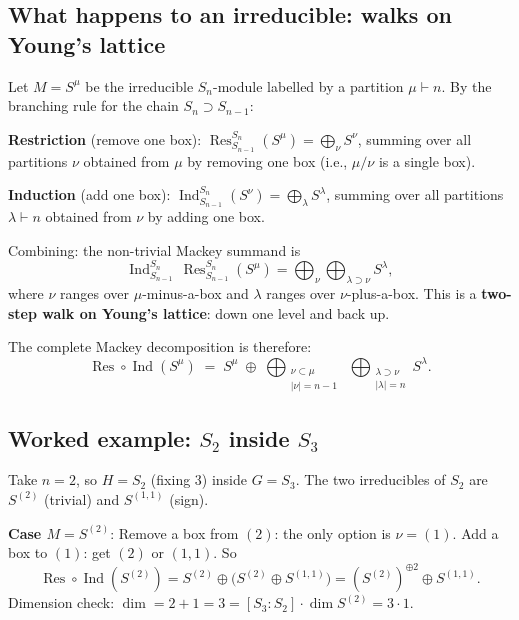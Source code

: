 \documentclass[12pt,a4paper]{article}
\theoremstyle{definition}
\theoremstyle{remark}
\newcommand{\Ind}{\operatorname{Ind}}
\newcommand{\Res}{\operatorname{Res}}
\begin{document}
\subsection{What happens to an irreducible: walks on Young's lattice}

Let $M = S^\mu$ be the irreducible $S_n$-module labelled by a
partition $\mu \vdash n$. By the branching rule for the chain
$S_n \supset S_{n-1}$:

\medskip\noindent\textbf{Restriction} (remove one box):
$\Res_{S_{n-1}}^{S_n}(S^\mu) = \bigoplus_\nu S^\nu$,
summing over all partitions $\nu$ obtained from $\mu$ by removing
one box (i.e., $\mu/\nu$ is a single box).

\medskip\noindent\textbf{Induction} (add one box):
$\Ind_{S_{n-1}}^{S_n}(S^\nu) = \bigoplus_\lambda S^\lambda$,
summing over all partitions $\lambda \vdash n$ obtained from $\nu$
by adding one box.

\medskip\noindent Combining: the non-trivial Mackey summand is
\begin{equation}\label{eq:two-step-walk}
  \Ind_{S_{n-1}}^{S_n}\,\Res_{S_{n-1}}^{S_n}(S^\mu)
  = \bigoplus_\nu \bigoplus_{\lambda \supset \nu} S^\lambda,
\end{equation}
where $\nu$ ranges over $\mu$-minus-a-box and $\lambda$ ranges over
$\nu$-plus-a-box. This is a \textbf{two-step walk on Young's lattice}:
down one level and back up.

The complete Mackey decomposition is therefore:
\[
  \Res \circ \Ind(S^\mu) \;=\;
  S^\mu \;\oplus\;
  \bigoplus_{\substack{\nu \subset \mu \\ |\nu| = n-1}}
  \;\bigoplus_{\substack{\lambda \supset \nu \\ |\lambda| = n}}
  S^\lambda.
\]

\subsection{Worked example: $S_2$ inside $S_3$}

Take $n = 2$, so $H = S_2$ (fixing 3) inside $G = S_3$.
The two irreducibles of $S_2$ are $S^{(2)}$ (trivial) and
$S^{(1,1)}$ (sign).

\medskip\noindent\textbf{Case $M = S^{(2)}$}: Remove a box from
$(2)$: the only option is $\nu = (1)$. Add a box to $(1)$: get $(2)$
or $(1,1)$. So
\[
  \Res \circ \Ind(S^{(2)})
  = S^{(2)} \oplus \bigl(S^{(2)} \oplus S^{(1,1)}\bigr)
  = (S^{(2)})^{\oplus 2} \oplus S^{(1,1)}.
\]
Dimension check: $\dim = 2 + 1 = 3 = [S_3:S_2] \cdot \dim S^{(2)}
= 3 \cdot 1$. \checkmark
\end{document}

